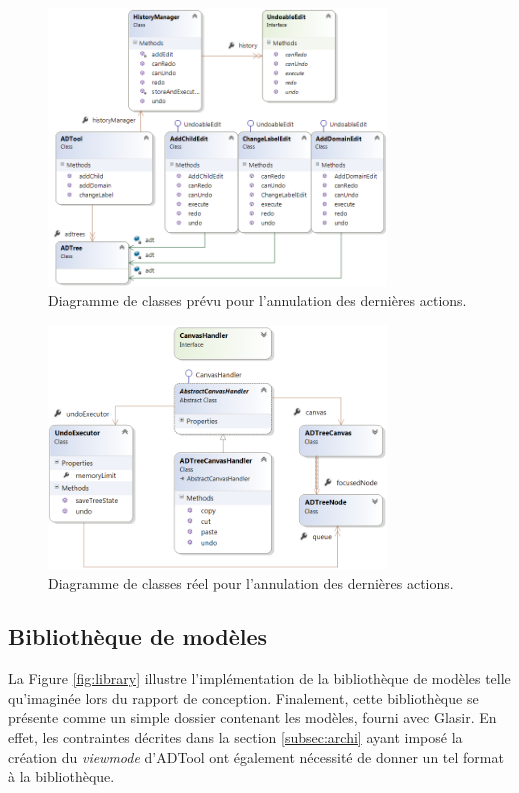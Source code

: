         \begin{figure}
            \centering
                \includegraphics[width=0.8\textwidth]{figure/ctrlz.png}
            \caption{Diagramme de classes prévu pour l'annulation des dernières actions.}
            \label{fig:ctrlzPrevu}
        \end{figure}
        
        \begin{figure}
            \centering
                \includegraphics[width=0.8\textwidth]{figure/ctrlzReel.png}
            \caption{Diagramme de classes réel pour l'annulation des dernières actions.}
            \label{fig:ctrlzReel}
        \end{figure}

	\subsection{Bibliothèque de modèles}
		La {\sc Figure} \ref{fig:library} illustre l'implémentation de la bibliothèque de modèles telle qu'imaginée lors du rapport de conception. Finalement, cette bibliothèque se présente comme un simple dossier contenant les modèles, fourni avec Glasir. En effet, les contraintes décrites dans la {\sc section} \ref{subsec:archi} ayant imposé la création du \emph{viewmode} d'ADTool ont également nécessité de donner un tel format à la bibliothèque.
		
